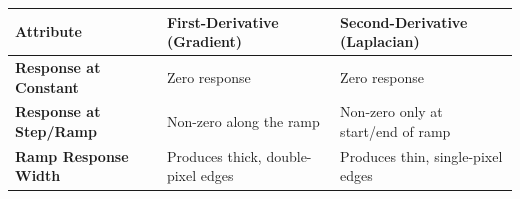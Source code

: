 \documentclass[12pt,a4paper]{article}
\renewcommand{\arraystretch}{1.45}
\begin{document}
\begin{tcolorbox}[tikzbox, title={Comparison of Sharpening Operators}]
\centering
{\renewcommand{\arraystretch}{1.55}%
\begin{tabularx}{\linewidth}{|>{\bfseries}B{3.5cm}|Y|Y|}
\hline
Attribute & First-Derivative (Gradient) & Second-Derivative (Laplacian) \\
\hline
Response at Constant & Zero response & Zero response \\
\hline
Response at Step/Ramp & Non-zero along the ramp & Non-zero only at start/end of ramp \\
\hline
Ramp Response Width & Produces thick, double-pixel edges & Produces thin, single-pixel edges \\
\hline
\end{tabularx}}
\end{tcolorbox}
\end{document}
